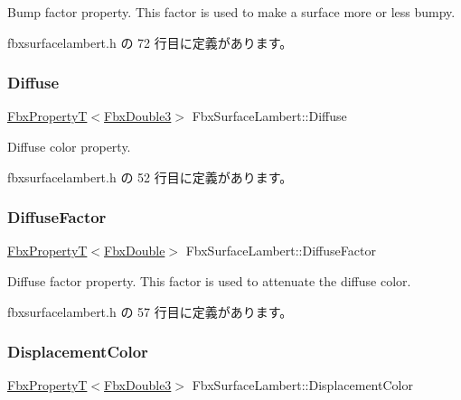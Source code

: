 Bump factor property. This factor is used to make a surface more or less bumpy. 

 fbxsurfacelambert.\+h の 72 行目に定義があります。

\mbox{\label{class_fbx_surface_lambert_a95f3a1ebeb92afb1e41a83088cc7e71f}} 
\subsubsection{\texorpdfstring{Diffuse}{Diffuse}}
{\footnotesize\ttfamily \hyperlink{class_fbx_property_t}{Fbx\+PropertyT}$<$\hyperlink{fbxtypes_8h_ae0a96f14cde566774c7553aa7523b7a7}{Fbx\+Double3}$>$ Fbx\+Surface\+Lambert\+::\+Diffuse}



Diffuse color property. 



 fbxsurfacelambert.\+h の 52 行目に定義があります。

\mbox{\label{class_fbx_surface_lambert_a360be5445d5d6e4ab1fcba621853b32e}} 
\subsubsection{\texorpdfstring{Diffuse\+Factor}{DiffuseFactor}}
{\footnotesize\ttfamily \hyperlink{class_fbx_property_t}{Fbx\+PropertyT}$<$\hyperlink{fbxtypes_8h_a171e72a1c46fc15c1a6c9c31948c1c5b}{Fbx\+Double}$>$ Fbx\+Surface\+Lambert\+::\+Diffuse\+Factor}

Diffuse factor property. This factor is used to attenuate the diffuse color. 

 fbxsurfacelambert.\+h の 57 行目に定義があります。

\mbox{\label{class_fbx_surface_lambert_a8a3ed77989cf29c09cc0f2ba984f908b}} 
\subsubsection{\texorpdfstring{Displacement\+Color}{DisplacementColor}}
{\footnotesize\ttfamily \hyperlink{class_fbx_property_t}{Fbx\+PropertyT}$<$\hyperlink{fbxtypes_8h_ae0a96f14cde566774c7553aa7523b7a7}{Fbx\+Double3}$>$ Fbx\+Surface\+Lambert\+::\+Displacement\+Color}



